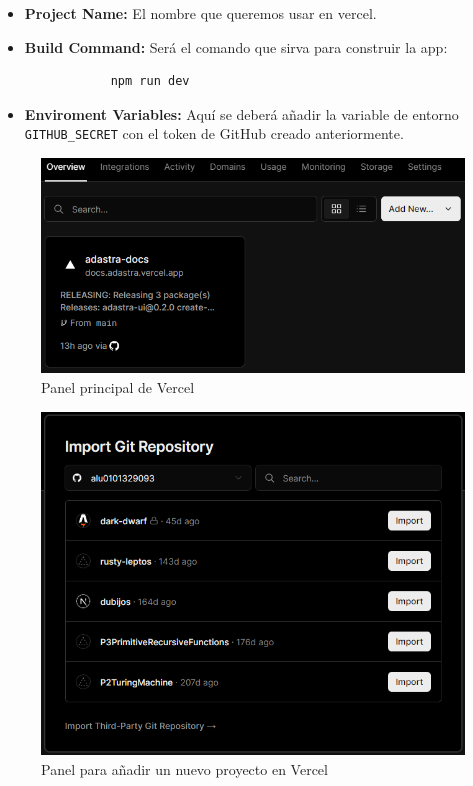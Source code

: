 \begin{itemize}
    \item \textbf{Project Name:} El nombre que queremos usar en vercel.
    \item \textbf{Build Command:} Será el comando que sirva para construir la app: 
        \begin{verbatim}
            npm run dev
        \end{verbatim}
    \item \textbf{Enviroment Variables:} Aquí se deberá añadir la variable de entorno \verb|GITHUB_SECRET| con el token de GitHub creado anteriormente.
\end{itemize}

\begin{figure}
    \centering
    \includegraphics{images/vercelPanel.png}
    \caption{Panel principal de Vercel}
    \label{fig:vercelPanel}
\end{figure}

\begin{figure}
    \centering
    \includegraphics{images/vercelNewProject.png}
    \caption{Panel para añadir un nuevo proyecto en Vercel}
    \label{fig:vercelNewProject}
\end{figure}

